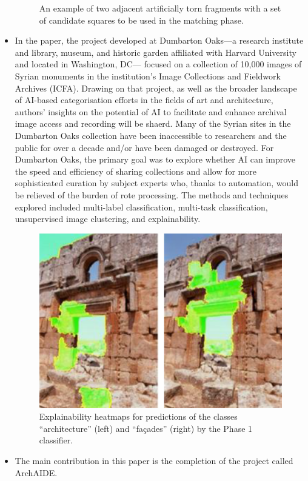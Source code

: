 \documentclass[journal]{IEEEtran}
\begin{document}
\begin{itemize}
\begin{figure}[htbp]
			\caption{An example of two adjacent artificially torn fragments with a set of candidate squares to be used in
			the matching phase.}
		  \end{figure}
	\item In the paper\cite{Syrian_images}, the project developed at Dumbarton Oaks---a research institute and library, museum, and historic 
		  garden affiliated with Harvard University and located in Washington, DC--- focused on a 
		  collection of 10,000 images of Syrian monuments in the institution's Image Collections and 
		  Fieldwork Archives (ICFA). Drawing on that project, as well as the broader landscape of AI-based categorisation efforts in the fields of art and architecture, authors' insights on the potential of AI to facilitate and enhance archival image access and recording will be shaerd. Many of the Syrian sites in the Dumbarton Oaks collection have been inaccessible to researchers and the public for over a decade and/or have been damaged or destroyed. For Dumbarton Oaks, the primary goal was to explore whether AI can improve the speed and efficiency of sharing collections and allow for more sophisticated curation by subject experts who, thanks to automation, would be relieved of the burden of rote processing. The methods and techniques explored included multi-label classification, multi-task classification, unsupervised image clustering, and explainability.
		  \begin{figure}[htbp]
			\centering
			\includegraphics[width=0.9\linewidth]{./picture/fig2.png}
			\caption{Explainability heatmaps for predictions of the 
			classes “architecture” (left) and “façades” (right) by the 
			Phase 1 classifier.}
		  \end{figure}
	\item The main contribution in this paper\cite{heritage4010008} is the completion of the project called ArchAIDE.

\end{itemize}
\end{document}
